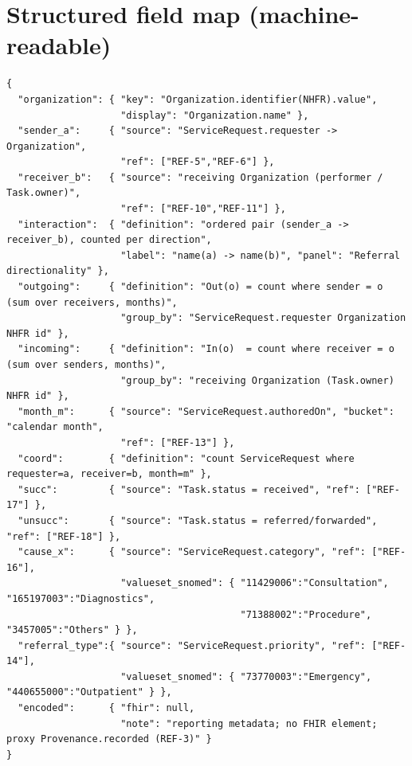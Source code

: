 \documentclass[11pt]{article}
\begin{document}
\section{Structured field map (machine-readable)}
\begingroup
\footnotesize
\begin{verbatim}
{
  "organization": { "key": "Organization.identifier(NHFR).value",
                    "display": "Organization.name" },
  "sender_a":     { "source": "ServiceRequest.requester -> Organization",
                    "ref": ["REF-5","REF-6"] },
  "receiver_b":   { "source": "receiving Organization (performer / Task.owner)",
                    "ref": ["REF-10","REF-11"] },
  "interaction":  { "definition": "ordered pair (sender_a -> receiver_b), counted per direction",
                    "label": "name(a) -> name(b)", "panel": "Referral directionality" },
  "outgoing":     { "definition": "Out(o) = count where sender = o (sum over receivers, months)",
                    "group_by": "ServiceRequest.requester Organization NHFR id" },
  "incoming":     { "definition": "In(o)  = count where receiver = o (sum over senders, months)",
                    "group_by": "receiving Organization (Task.owner) NHFR id" },
  "month_m":      { "source": "ServiceRequest.authoredOn", "bucket": "calendar month",
                    "ref": ["REF-13"] },
  "coord":        { "definition": "count ServiceRequest where requester=a, receiver=b, month=m" },
  "succ":         { "source": "Task.status = received", "ref": ["REF-17"] },
  "unsucc":       { "source": "Task.status = referred/forwarded", "ref": ["REF-18"] },
  "cause_x":      { "source": "ServiceRequest.category", "ref": ["REF-16"],
                    "valueset_snomed": { "11429006":"Consultation", "165197003":"Diagnostics",
                                         "71388002":"Procedure", "3457005":"Others" } },
  "referral_type":{ "source": "ServiceRequest.priority", "ref": ["REF-14"],
                    "valueset_snomed": { "73770003":"Emergency", "440655000":"Outpatient" } },
  "encoded":      { "fhir": null,
                    "note": "reporting metadata; no FHIR element; proxy Provenance.recorded (REF-3)" }
}
\end{verbatim}
\endgroup
\end{document}
